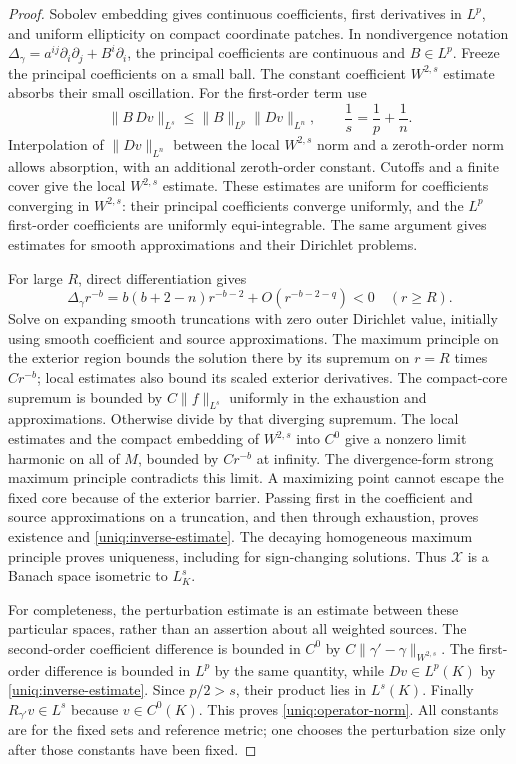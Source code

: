 \begin{proof}
Sobolev embedding gives continuous coefficients, first derivatives
in $L^p$, and uniform ellipticity on compact coordinate patches.
In nondivergence notation
$\Delta_\gamma=a^{ij}\partial_i\partial_j+B^i\partial_i$,
the principal coefficients are continuous and $B\in L^p$.
Freeze the principal coefficients on a small ball. The constant
coefficient $W^{2,s}$ estimate absorbs their small oscillation.
For the first-order term use
\[
 \|B\,Dv\|_{L^s}
 \leq \|B\|_{L^p}\|Dv\|_{L^n},\qquad
 \frac1s=\frac1p+\frac1n.
\]
Interpolation of $\|Dv\|_{L^n}$ between the local $W^{2,s}$
norm and a zeroth-order norm allows absorption, with an additional
zeroth-order constant. Cutoffs and a finite cover give the local
$W^{2,s}$ estimate. These estimates are uniform for coefficients
converging in $W^{2,s}$: their principal coefficients converge
uniformly, and the $L^p$ first-order coefficients are uniformly
equi-integrable. The same argument gives estimates for smooth
approximations and their Dirichlet problems.

For large $R$, direct differentiation gives
\begin{equation}\label{uniq:end-barrier}
 \Delta_\gamma r^{-b}
   =b(b+2-n)r^{-b-2}+O(r^{-b-2-q})<0
 \quad (r\geq R).
\end{equation}
Solve on expanding smooth truncations with zero outer Dirichlet
value, initially using smooth coefficient and source approximations.
The maximum principle on the exterior region bounds the solution
there by its supremum on $r=R$ times $C r^{-b}$; local estimates
also bound its scaled exterior derivatives. The compact-core
supremum is bounded by $C\|f\|_{L^s}$ uniformly in the
exhaustion and approximations. Otherwise divide by that diverging
supremum. The local estimates and the compact embedding of
$W^{2,s}$ into $C^0$ give a nonzero limit harmonic on all of $M$,
bounded by $Cr^{-b}$ at infinity. The divergence-form strong maximum
principle contradicts this limit. A maximizing point cannot escape
the fixed core because of the exterior barrier. Passing first in
the coefficient and source approximations on a truncation, and
then through exhaustion, proves existence and
\eqref{uniq:inverse-estimate}. The decaying homogeneous maximum
principle proves uniqueness, including for sign-changing solutions.
Thus $\mathcal X$ is a Banach space isometric to $L^s_K$.

For completeness, the perturbation estimate is an estimate between
these particular spaces, rather than an assertion about all weighted
sources. The second-order coefficient difference is bounded in
$C^0$ by $C\|\gamma'-\gamma\|_{W^{2,s}}$. The first-order
difference is bounded in $L^p$ by the same quantity, while
$Dv\in L^p(K)$ by \eqref{uniq:inverse-estimate}. Since
$p/2>s$, their product lies in $L^s(K)$. Finally
$R_{\gamma'}v\in L^s$ because $v\in C^0(K)$.
This proves \eqref{uniq:operator-norm}. All constants are for the
fixed sets and reference metric; one chooses the perturbation
size only after those constants have been fixed.
\end{proof}

